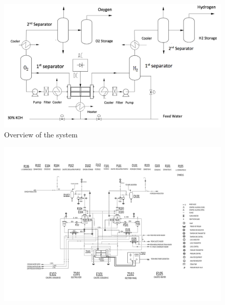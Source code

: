 \documentclass[11pt, a4paper]{article}
\begin{document}
\begin{figure}[H]
\centering
\includegraphics[width= 10 cm] {overview.png} 
\caption{Overview of the system} \label{fig:overview}
\end{figure}  


\begin{figure}[H]
\centering
\includegraphics[width= 25 cm, angle=90] {cadcad.pdf}
\end{figure}

%
\end{document}
